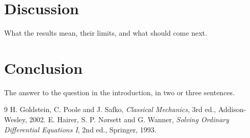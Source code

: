 \documentclass[11pt,a4paper]{article}
\begin{document}
\section{Discussion}

What the results mean, their limits, and what should come next.

\section{Conclusion}

The answer to the question in the introduction, in two or three sentences.

\begin{thebibliography}{9}
 H. Goldstein, C. Poole and J. Safko, \emph{Classical Mechanics}, 3rd ed., Addison-Wesley, 2002.
 E. Hairer, S. P. Nørsett and G. Wanner, \emph{Solving Ordinary Differential Equations I}, 2nd ed., Springer, 1993.
\end{thebibliography}
\end{document}
